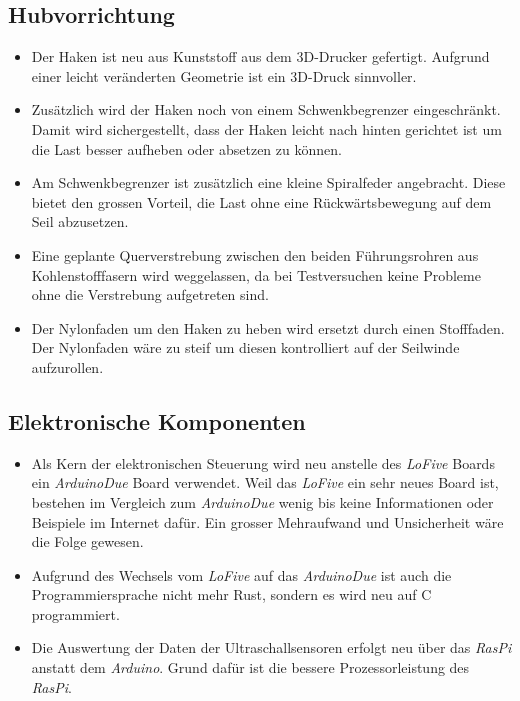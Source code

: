 \documentclass[a4paper]{report}
\begin{document}
\subsection{Hubvorrichtung}

\begin{itemize}
		\item Der Haken ist neu aus Kunststoff aus dem 3D-Drucker gefertigt. Aufgrund einer leicht veränderten Geometrie ist ein 3D-Druck sinnvoller.
		\item Zusätzlich wird der Haken noch von einem Schwenkbegrenzer eingeschränkt. Damit wird sichergestellt, dass der Haken leicht nach hinten gerichtet ist um die Last besser aufheben oder absetzen zu können.
		\item Am Schwenkbegrenzer ist zusätzlich eine kleine Spiralfeder angebracht. Diese bietet den grossen Vorteil, die Last ohne eine Rückwärtsbewegung auf dem Seil abzusetzen.
		\item Eine geplante Querverstrebung zwischen den beiden Führungsrohren aus Kohlenstofffasern wird weggelassen, da bei Testversuchen keine Probleme ohne die Verstrebung aufgetreten sind.
		\item Der Nylonfaden um den Haken zu heben wird ersetzt durch einen Stofffaden. Der Nylonfaden wäre zu steif um diesen kontrolliert auf der Seilwinde aufzurollen.
\end{itemize}

\subsection{Elektronische Komponenten}

\begin{itemize}
		\item Als Kern der elektronischen Steuerung wird neu anstelle des \textit{LoFive} Boards ein \textit{ArduinoDue} Board verwendet. Weil das \textit{LoFive} ein sehr neues Board ist, bestehen im Vergleich zum \textit{ArduinoDue} wenig bis keine Informationen oder Beispiele im Internet dafür. Ein grosser Mehraufwand und Unsicherheit wäre die Folge gewesen.
		\item Aufgrund des Wechsels vom \textit{LoFive} auf das \textit{ArduinoDue} ist auch die Programmiersprache nicht mehr Rust, sondern es wird neu auf C programmiert.
		\item Die Auswertung der Daten der Ultraschallsensoren erfolgt neu über das \textit{RasPi} anstatt dem \textit{Arduino}. Grund dafür ist die bessere Prozessorleistung des \textit{RasPi}.
\end{itemize}
\end{document}
